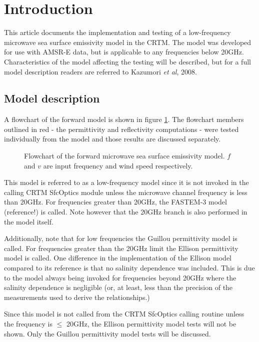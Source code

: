 \section{Introduction}
This article documents the implementation and testing of a low-frequency microwave sea surface emissivity model in the CRTM. The model was developed for use with AMSR-E data, but is applicable to any frequencies below 20GHz. Characteristics of the model affecting the testing will be described, but for a full model description readers are referred to Kazumori \textit{et al}, 2008\cite{Kazumori_etal_2008}.

\subsection{Model description}
\label{sec:model_description}
A flowchart of the forward model is shown in figure \ref{fig:main_flowchart}. The flowchart members outlined in red - the permittivity and reflectivity computations - were tested individually from the model and those results are discussed separately.
\begin{figure}[htp]
  \centering
  
  \caption{Flowchart of the forward microwave sea surface emissivity model. $f$ and $v$ are input frequency and wind speed respectively.}
  \label{fig:main_flowchart}
\end{figure}
This model is referred to as a low-frequency model since it is not invoked in the calling CRTM SfcOptics module unless the microwave channel frequency is less than 20GHz. For frequencies greater than 20GHz, the FASTEM-3 model (reference!) is called. Note however that the 20GHz branch is also performed in the model itself.

Additionally, note that for low frequencies the Guillou permittivity model \cite{Guillou_etal_1998} is called. For frequencies greater than the 20GHz limit the Ellison permittivity model \cite{Ellison_etal_2003} is called. One difference in the implementation of the Ellison model compared to its reference is that no salinity dependence was included. This is due to the model always being invoked for frequencies beyond 20GHz where the salinity dependence is negligible (or, at least, less than the precision of the measurements used to derive the relationships.)

Since this model is not called from the CRTM SfcOptics calling routine unless the frequency is $\le$ 20GHz, the Ellison permittivity model tests will not be shown. Only the Guillou permittivity model tests will be discussed.

